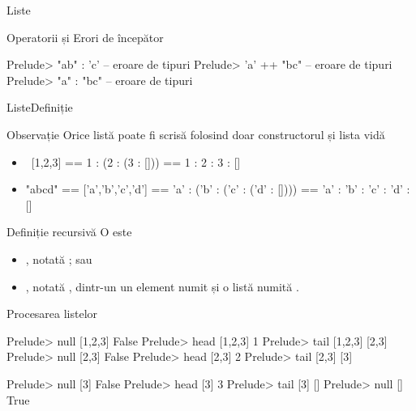 \documentclass[handout,xcolor=pdftex,romanian,colorlinks]{beamer}
\begin{document}
\begin{section}{Liste}
\begin{frame}[fragile]{Operatorii \structure{:} și \structure{++}}{Erori de începător}
\begin{minipage}[t]{.49\columnwidth}
\end{minipage}
\begin{minipage}[t]{.49\columnwidth}
\begin{asciihs}
Prelude> "ab" : 'c'
  -- eroare de tipuri
Prelude> 'a' ++ "bc"
  -- eroare de tipuri
Prelude> "a" : "bc"
  -- eroare de tipuri
\end{asciihs}

\end{minipage}
\end{frame}

\begin{frame}{Liste}{Definiție}
\begin{block}
{Observație}
Orice listă poate fi scrisă folosind doar constructorul \structure{(:)} și lista vidă \structure{[]}
\begin{itemize}
\item\ [1,2,3] == 1 : (2 : (3 : [])) == 1 : 2 : 3 : []
\item "abcd" == ['a','b','c','d'] == 'a' : ('b' : ('c' : ('d' : []))) == 'a' : 'b' : 'c' : 'd' : []
\end{itemize}
\end{block}
\vfill
\begin{block}{Definiție recursivă}
O  este
\begin{itemize}
\item {}, notată \structure{[]}; sau
\item {}, notată , dintr-un un element  numit  și o listă  numită .
\end{itemize}
\end{block}
\vfill
\end{frame}

\begin{frame}[fragile]{Procesarea listelor}

\begin{minipage}[b]{.49\columnwidth}
\begin{asciihs}
Prelude> null [1,2,3]
False
Prelude> head [1,2,3]
1
Prelude> tail [1,2,3]
[2,3]
Prelude> null [2,3]
False
Prelude> head [2,3]
2
Prelude> tail [2,3]
[3]
\end{asciihs}
\end{minipage}
\begin{minipage}{.49\columnwidth}
\begin{asciihs}
Prelude> null [3]
False
Prelude> head [3]
3
Prelude> tail [3]
[]
Prelude> null []
True
\end{asciihs}
\end{minipage}
\end{frame}

\end{section}
\end{document}
